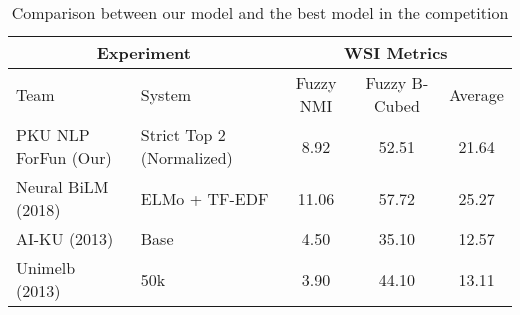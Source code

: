 \begin{table}[htbp!]
    \centering
    \begin{tabular}{llccc}
    \toprule
        \multicolumn{2}{c}{Experiment}                    & \multicolumn{3}{c}{WSI Metrics}           \\
    \midrule
        Team                    & System                     & Fuzzy NMI     & Fuzzy B-Cubed  & Average  \\
    \midrule
        PKU NLP ForFun (Our)    & Strict Top 2 (Normalized)  & 8.92          & 52.51          & 21.64    \\
        Neural BiLM (2018)      & ELMo + TF-EDF              & 11.06         & 57.72          & 25.27    \\
        AI-KU (2013)            & Base                       & 4.50          & 35.10          & 12.57    \\
        Unimelb (2013)          & 50k                        & 3.90          & 44.10          & 13.11    \\
    \bottomrule
    \end{tabular}
\caption{Comparison between our model and the best model in the competition}
\label{tab:best_result}
\end{table}